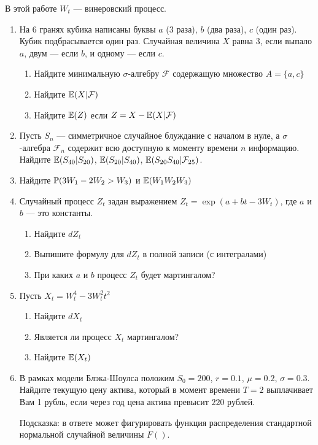 \documentclass[pdftex,12pt,a4paper]{article}
\begin{document}
В этой работе $W_t$ --- винеровский процесс.


\begin{enumerate}
\item На 6 гранях кубика написаны буквы $a$ (3 раза), $b$ (два раза), $c$ (один раз). Кубик подбрасывается один раз. Случайная величина $X$ равна 3, если выпало $a$, двум --- если $b$, и одному --- если $c$.
\begin{enumerate}
\item Найдите минимальную $\sigma$-алгебру $\mathcal{F}$ содержащую множество $A=\{a, c\}$
\item Найдите $\E(X|\mathcal{F})$
\item Найдите $\E(Z)$ если $Z = X - \E(X|\mathcal{F})$
\end{enumerate}


\item Пусть $S_n$ --- симметричное случайное блуждание с началом в нуле, а $\sigma$-алгебра $\mathcal{F}_n$ содержит всю доступную к моменту времени $n$ информацию. Найдите $\E(S_{40}|S_{20})$, $\E(S_{20}|S_{40})$, $\E(S_{20} S_{40} | \mathcal{F}_{25})$.


\item Найдите $\P(3W_1 - 2W_2 > W_3)$ и $\E(W_1 W_2 W_3)$ 

\item Случайный процесс $Z_t$ задан выражением $Z_t=\exp(a+bt-3W_t)$, где $a$ и $b$ --- это константы. 
\begin{enumerate}
\item Найдите $dZ_t$
\item Выпишите формулу для $dZ_t$ в полной записи (с интегралами)
\item При каких $a$ и $b$ процесс $Z_t$ будет мартингалом?
\end{enumerate}


\item Пусть $X_t=W_t^4-3W_t^2 t^2$
\begin{enumerate}
\item Найдите $dX_t$
\item Является ли процесс $X_t$ мартингалом?
\item Найдите $\E(X_t)$
\end{enumerate}


\item  В рамках модели Блэка-Шоулса положим $S_0=200$, $r=0.1$, $\mu=0.2$, $\sigma=0.3$. Найдите текущую цену актива, который в момент времени $T=2$ выплачивает Вам 1 рубль, если через год цена актива превысит $220$ рублей.

Подсказка: в ответе может фигурировать функция распределения стандартной нормальной случайной величины $F()$.




\end{enumerate}
\end{document}
